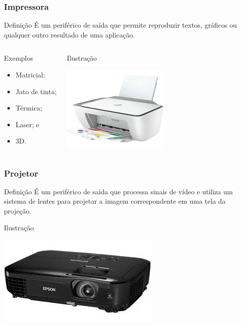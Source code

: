 \documentclass[aspectratio=169]{beamer} %
\begin{document}
\begin{frame}
	\frametitle{Impressora}
	
	\begin{block}{Defini\c cão}
		É um periférico de saída que permite reproduzir textos, gráficos ou qualquer outro resultado de uma aplicação.
	\end{block}\vfill	
	
	\begin{columns}
		\begin{exampleblock}{Exemplos}
		\begin{itemize}
			\item Matricial;
			\item Jato de tinta;
			\item Térmica;
			\item Laser; e
			\item 3D.
		\end{itemize}
		\end{exampleblock}

		\begin{exampleblock}{Ilustra\c cão}
			\begin{center}
				\includegraphics[scale=0.5]{img/impressora}
			\end{center}		
		\end{exampleblock}
	\end{columns}
\end{frame}

\begin{frame}
	\frametitle{Projetor}
	
	\begin{block}{Defini\c cão}
		É um periférico de saída que processa sinais de vídeo e utiliza um sistema de lentes para projetar a imagem correspondente em uma tela da projeção.
	\end{block}\vfill
	
	\begin{exampleblock}{Ilustra\c cão}
		\begin{center}
			\includegraphics[scale=0.5]{img/projetor}
		\end{center}		
	\end{exampleblock}
\end{frame}
\end{document}
